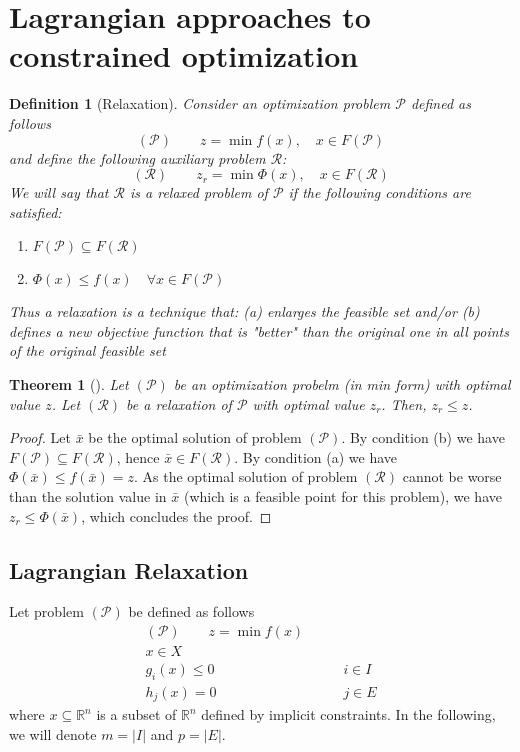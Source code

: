 \documentclass{book}
\newcommand{\R}{\mathbb{R}}
\theoremstyle{theoremv2}
\newtheorem{theorem}{Theorem}[chapter]
\theoremstyle{defv2}
\newtheorem{definition}{Definition}[chapter]
\theoremstyle{remark}
\theoremstyle{remark}
\begin{document}
\section{Lagrangian approaches to constrained optimization}
\begin{definition}[Relaxation]
    Consider an optimization problem $\mathcal{P}$ defined as follows
    \[
        (\mathcal{P}) \qquad z=\min f(x), \quad x\in F(\mathcal{P})
    \]
    and define the following auxiliary problem $\mathcal{R}$:
    \[
        (\mathcal{R}) \qquad z_r=\min \Phi(x), \quad x\in F(\mathcal{R})
    \]
    We will say that $\mathcal{R}$ is a \emph{relaxed problem} of $\mathcal{P}$ if the following conditions are satisfied:
    \begin{enumerate}[label=(\alph*)]
        \item $F(\mathcal{P})\subseteq F(\mathcal{R})$
        \item $\Phi(x) \leq f(x) \quad \forall x\in F(\mathcal{P})$
    \end{enumerate}
    Thus a relaxation is a technique that: (a) enlarges the feasible set and/or (b) defines a new objective function that is "better" than the original one in all points of the original feasible set
\end{definition}
\begin{theorem}[]
    \label{relax}
    Let $(\mathcal{P})$ be an optimization probelm (in min form) with optimal value $z$. Let $(\mathcal{R})$ be a relaxation of $\mathcal{P}$ with optimal value $z_r$. Then, $z_r\leq z$.
\end{theorem}
\begin{proof}
    Let $\bar{x}$ be the optimal solution of problem $(\mathcal{P})$. By condition (b) we have $F(\mathcal{P})\subseteq F(\mathcal{R})$, hence $\bar{x}\in F(\mathcal{R})$. By condition (a) we have $\Phi(\bar{x})\leq f(\bar{x})=z$. As the optimal solution of problem $(\mathcal{R})$ cannot be worse than the solution value in $\bar{x}$ (which is a feasible point for this problem), we have $z_r\leq \Phi(\bar{x})$, which concludes the proof.
\end{proof}
\subsection{Lagrangian Relaxation}
Let problem $(\mathcal{P})$ be defined as follows
\begin{align*}
    (\mathcal{P}) \qquad z=\min f(x) &\\
    x\in X &\\
    g_i(x)\leq 0 & \qquad i\in I \\
    h_j(x)= 0 & \qquad j\in E
\end{align*}
where $x\subseteq \R^n$ is a subset of $\R^n$ defined by implicit constraints. In the following, we will denote $m=|I|$ and $p=|E|$.
\end{document}
